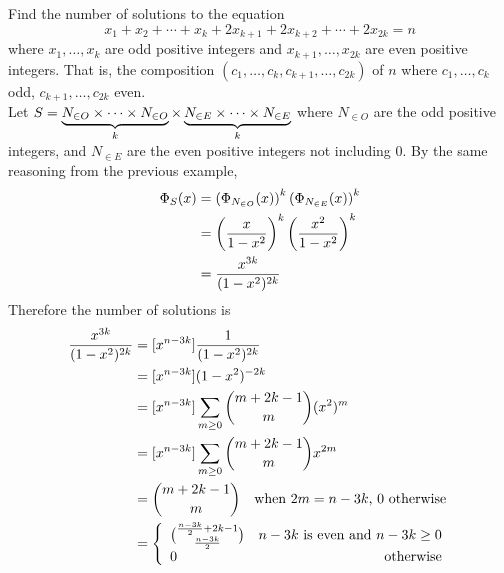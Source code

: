 \documentclass[english, 11pt]{article}
\begin{document}
   \begin{exmp}
     Find the number of solutions to the equation
     \[ x_1 + x_2 + \cdots + x_k + 2x_{k+1} + 2x_{k+2} + \cdots + 2x_{2k} = n \]
     where $x_1, \ldots, x_k$ are odd positive integers and $x_{k+1}, \ldots, x_{2k}$ are even positive integers. That is, the composition $(c_1, \ldots, c_k, c_{k+1}, \ldots, c_{2k})$ of $n$ where $c_1, \ldots, c_k$ odd, $c_{k+1}, \ldots, c_{2k}$ even. \\

     Let $S = \underbrace{N_{\in O} \times \cdots \times N_{\in O}}_{k} \times \underbrace{N_{\in E} \times \cdots \times N_{\in E}}_{k}$ where $N_{\in O}$ are the odd positive integers,  and $N_{\in E}$ are the even positive integers not including 0. By the same reasoning from the previous example,
     \begin{align*}
       \Phi_S(x) & = \left( \Phi_{N_{\in O}} (x) \right)^k \left( \Phi_{N_{\in E}} (x) \right)^k \\
                 & = \left( \frac{x}{1-x^2} \right)^k \left( \frac{x^2}{1-x^2} \right)^k \\
                 & = \frac{x^{3k}}{(1-x^2)^{2k}}
     \end{align*}
     Therefore the number of solutions is
     \begin{align*}
       [x^n] \f{x^{3k}}{(1-x^2)^{2k}} & = [x^{n-3k}] \f{1}{(1-x^2)^{2k}} \\
       & = [x^{n-3k}] (1-x^2)^{-2k} \\
       & = [x^{n- 3k}] \sum_{m \geq 0} \comb{m + 2k - 1}{m}(x^2)^m \\
       & = [x^{n- 3k}] \sum_{m \geq 0} \comb{m + 2k - 1}{m}x^{2m} \\
       & = \comb{m+2k-1}{m} \mbox{ \ \ when $2m = n - 3k$, 0 otherwise} \\
       & = \piecewise{\comb{\f{n-3k}{2} + 2k -1}{\f{n-3k}{2}}}{$n-3k$ is even and $n - 3k \geq 0$}{0}{otherwise} \\
     \end{align*}
   \end{exmp}
\end{document}
